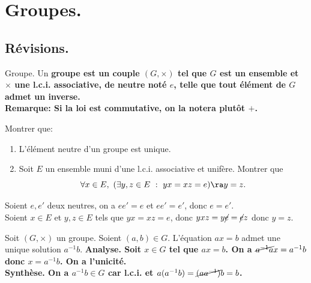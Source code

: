 \documentclass[11pt]{article}
\begin{document}


\thispagestyle{fancy}

\section{Groupes.}

\subsection{Révisions.}

\begin{defi}{Groupe.}{}
    Un \bf{groupe} est un couple $(G,\times)$ tel que $G$ est un ensemble et $\times$ une l.c.i. associative, de neutre noté $e$, telle que tout élément de $G$ admet un inverse.\\
    \bf{Remarque:} Si la loi est commutative, on la notera plutôt $+$.
\end{defi}

\vspace*{-0.7cm}

\begin{ex}{}{}
    Montrer que:
    \begin{enumerate}
        \item L'élément neutre d'un groupe est unique.
        \item Soit $E$ un ensemble muni d'une l.c.i. associative et unifère. Montrer que
        \begin{equation*}
            \forall x \in E, ~ (\exists y,z \in E ~ : ~ yx = xz = e) \ra y = z.
        \end{equation*}
    \end{enumerate}
    \tcblower
     Soient $e,e'$ deux neutres, on a $ee'=e$ et $ee'=e'$, donc $e=e'$.\\
     Soient $x\in E$ et $y,z\in E$ tels que $yx=xz=e$, donc $yxz=y\cancel{e}=\cancel{e}z$ donc $y=z$.
\end{ex}

\vspace*{-0.7cm}

\begin{prop}{}{}
    Soit $(G,\times)$ un groupe. Soient $(a,b)\in G$. L'équation $ax=b$ admet une unique solution $a^{-1}b$.
    \tcblower
    \bf{Analyse.} Soit $x\in G$ tel que $ax=b$. On a $\cancel{a^{-1}a}x=a^{-1}b$ donc $x=a^{-1}b$. On a l'unicité.\\
    \bf{Synthèse.} On a $a^{-1}b\in G$ car l.c.i. et $a(a^{-1}b)=\cancel{(aa^{-1})}b=b$.
\end{prop}
\end{document}
